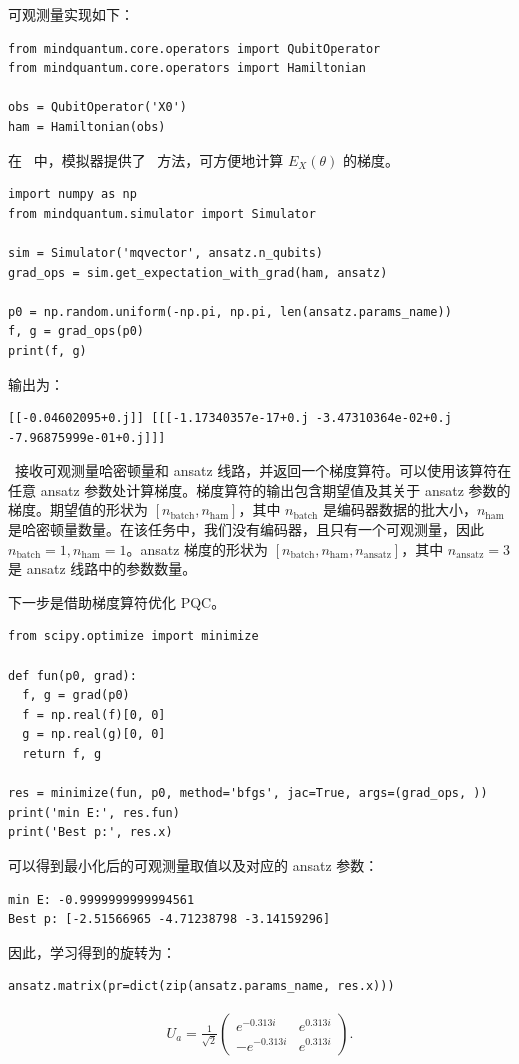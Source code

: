 可观测量实现如下：

\begin{lstlisting}
from mindquantum.core.operators import QubitOperator
from mindquantum.core.operators import Hamiltonian

obs = QubitOperator('X0')
ham = Hamiltonian(obs)
\end{lstlisting}

在 \MindQuantum\ 中，模拟器提供了 \getexpectationwithgrad\ 方法，可方便地计算 $E_X(\theta)$ 的梯度。

\begin{lstlisting}
import numpy as np
from mindquantum.simulator import Simulator

sim = Simulator('mqvector', ansatz.n_qubits)
grad_ops = sim.get_expectation_with_grad(ham, ansatz)

p0 = np.random.uniform(-np.pi, np.pi, len(ansatz.params_name))
f, g = grad_ops(p0)
print(f, g)
\end{lstlisting}
输出为：
\begin{lstlisting}
[[-0.04602095+0.j]] [[[-1.17340357e-17+0.j -3.47310364e-02+0.j -7.96875999e-01+0.j]]]
\end{lstlisting}

\getexpectationwithgrad\ 接收可观测量哈密顿量和 ansatz 线路，并返回一个梯度算符。可以使用该算符在任意 ansatz 参数处计算梯度。梯度算符的输出包含期望值及其关于 ansatz 参数的梯度。期望值的形状为 $[n_\text{batch}, n_\text{ham}]$，其中 $n_\text{batch}$ 是编码器数据的批大小，$n_\text{ham}$ 是哈密顿量数量。在该任务中，我们没有编码器，且只有一个可观测量，因此 $n_\text{batch}=1, n_\text{ham}=1$。ansatz 梯度的形状为 $[n_\text{batch}, n_\text{ham}, n_\text{ansatz}]$，其中 $n_\text{ansatz} = 3$ 是 ansatz 线路中的参数数量。

下一步是借助梯度算符优化 PQC。
\begin{lstlisting}
from scipy.optimize import minimize

def fun(p0, grad):
  f, g = grad(p0)
  f = np.real(f)[0, 0]
  g = np.real(g)[0, 0]
  return f, g

res = minimize(fun, p0, method='bfgs', jac=True, args=(grad_ops, ))
print('min E:', res.fun)
print('Best p:', res.x)
\end{lstlisting}
可以得到最小化后的可观测量取值以及对应的 ansatz 参数：
\begin{lstlisting}
min E: -0.9999999999994561
Best p: [-2.51566965 -4.71238798 -3.14159296]
\end{lstlisting}
因此，学习得到的旋转为：
\begin{lstlisting}
ansatz.matrix(pr=dict(zip(ansatz.params_name, res.x)))
\end{lstlisting}
\begin{align*}
  U_a=\frac{1}{\sqrt{2}}\begin{pmatrix}
    e^{-0.313i}  & e^{0.313i} \\
    -e^{-0.313i} & e^{0.313i}
  \end{pmatrix}.
\end{align*}

